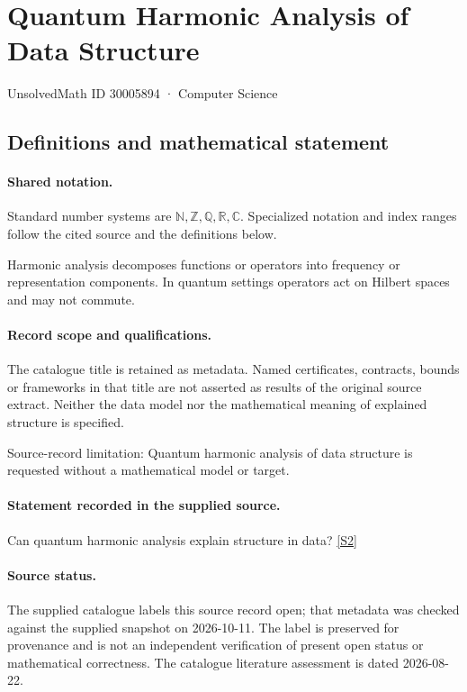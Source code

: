 \documentclass[11pt]{article}
\newcommand{\sref}[2]{\hyperlink{source:#1:#2}{[S#2]}}
\begin{document}
\setcounter{section}{30005893}
\section{Quantum Harmonic Analysis of Data Structure}\label{30005894}
{\small\sffamily UnsolvedMath ID 30005894 · Computer Science}
\subsection{Definitions and mathematical statement}

\paragraph{Shared notation.}Standard number systems are $\mathbb N,\mathbb Z,\mathbb Q,\mathbb R,\mathbb C$. Specialized notation and index ranges follow the cited source and the definitions below.


Harmonic analysis decomposes functions or operators into frequency or representation components. In quantum settings operators act on Hilbert spaces and may not commute.
\paragraph{Record scope and qualifications.}
The catalogue title is retained as metadata. Named certificates, contracts, bounds or frameworks in that title are not asserted as results of the original source extract.
Neither the data model nor the mathematical meaning of explained structure is specified.

Source-record limitation: Quantum harmonic analysis of data structure is requested without a mathematical model or target.
\paragraph{Statement recorded in the supplied source.}
Can quantum harmonic analysis explain structure in data? \sref{30005894}{2}
\paragraph{Source status.}
The supplied catalogue labels this source record open; that metadata was checked against the supplied snapshot on 2026-10-11. The label is preserved for provenance and is not an independent verification of present open status or mathematical correctness. The catalogue literature assessment is dated 2026-08-22.
\end{document}

